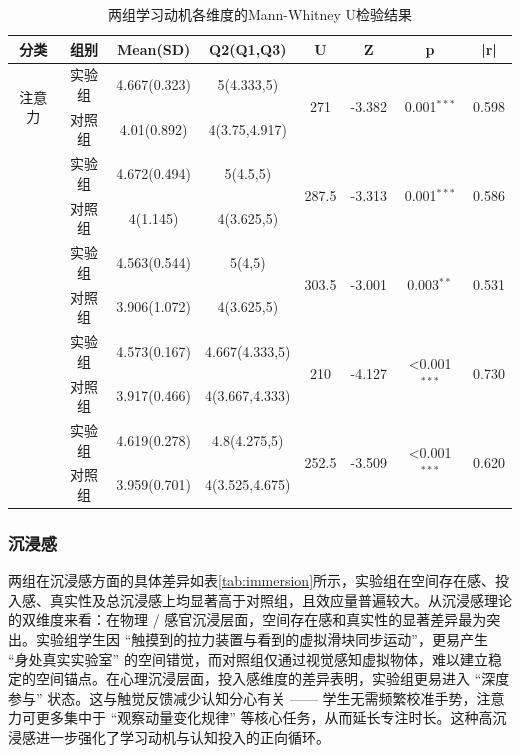 \documentclass[runningheads]{llncs}
\begin{document}
\begin{table}[t]
\centering
\setlength{\tabcolsep}{4.2pt} %
\caption{两组学习动机各维度的Mann-Whitney U检验结果}
\label{tab:learning-motivation}
\begin{tabularx}{\textwidth}{cccccccc}
\toprule
\textbf{分类} & \textbf{组别} & \textbf{Mean(SD)} & \textbf{Q2(Q1,Q3)} & \textbf{U} & \textbf{Z} & \textbf{p} & \textbf{|r|} \\
\midrule
\multirow{2}{*}{注意力} 
& 实验组 & 4.667(0.323) & 5(4.333,5) & \multirow{2}{*}{271} & \multirow{2}{*}{-3.382} & \multirow{2}{*}{0.001\(^{***}\)} & \multirow{2}{*}{0.598} \\
& 对照组 & 4.01(0.892) & 4(3.75,4.917) \\
\addlinespace
\multirow{2}{*}{相关性} 
& 实验组 & 4.672(0.494) & 5(4.5,5) & \multirow{2}{*}{287.5} & \multirow{2}{*}{-3.313} & \multirow{2}{*}{0.001\(^{***}\)} & \multirow{2}{*}{0.586} \\
& 对照组 & 4(1.145) & 4(3.625,5) \\
\addlinespace
\multirow{2}{*}{自信心} 
& 实验组 & 4.563(0.544) & 5(4,5) & \multirow{2}{*}{303.5} & \multirow{2}{*}{-3.001} & \multirow{2}{*}{0.003\(^{**}\)} & \multirow{2}{*}{0.531} \\
& 对照组 & 3.906(1.072) & 4(3.625,5) \\
\addlinespace
\multirow{2}{*}{满意度} 
& 实验组 & 4.573(0.167) & 4.667(4.333,5) & \multirow{2}{*}{210} & \multirow{2}{*}{-4.127} & \multirow{2}{*}{<0.001\(^{***}\)} & \multirow{2}{*}{0.730} \\
& 对照组 & 3.917(0.466) & 4(3.667,4.333) \\
\addlinespace
\multirow{2}{*}{学习动机} 
& 实验组 & 4.619(0.278) & 4.8(4.275,5) & \multirow{2}{*}{252.5} & \multirow{2}{*}{-3.509} & \multirow{2}{*}{<0.001\(^{***}\)} & \multirow{2}{*}{0.620} \\
& 对照组 & 3.959(0.701) & 4(3.525,4.675) \\
\bottomrule
\end{tabularx}
\end{table}

\subsubsection{沉浸感}
两组在沉浸感方面的具体差异如表\ref{tab:immersion}所示，实验组在空间存在感、投入感、真实性及总沉浸感上均显著高于对照组，且效应量普遍较大。从沉浸感理论的双维度来看：在物理 / 感官沉浸层面，空间存在感和真实性的显著差异最为突出。实验组学生因 “触摸到的拉力装置与看到的虚拟滑块同步运动”，更易产生 “身处真实实验室” 的空间错觉，而对照组仅通过视觉感知虚拟物体，难以建立稳定的空间锚点。在心理沉浸层面，投入感维度的差异表明，实验组更易进入 “深度参与” 状态。这与触觉反馈减少认知分心有关 —— 学生无需频繁校准手势，注意力可更多集中于 “观察动量变化规律” 等核心任务，从而延长专注时长。这种高沉浸感进一步强化了学习动机与认知投入的正向循环。
\end{document}
